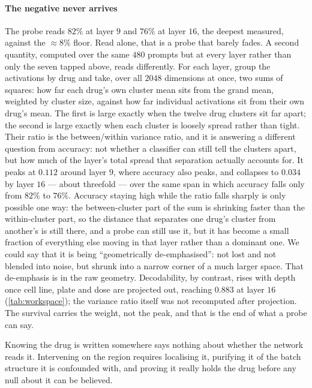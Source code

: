 \paragraph{The negative never arrives} The probe reads $82\%$ at layer $9$ and
$76\%$ at layer $16$, the deepest measured, against the $\approx 8\%$ floor.
Read alone, that is a probe that barely fades. A second quantity, computed over
the same $480$ prompts but at every layer rather than only the seven tapped
above, reads differently. For each layer, group the activations by drug and
take, over all $2048$ dimensions at once, two sums of squares: how far each
drug's own cluster mean sits from the grand mean, weighted by cluster size,
against how far individual activations sit from their own drug's mean. The
first is large exactly when the twelve drug clusters sit far apart; the second
is large exactly when each cluster is loosely spread rather than tight. Their
ratio is the between/within variance ratio, and it is answering a different
question from accuracy: not whether a classifier can still tell the clusters
apart, but how much of the layer's total spread that separation actually
accounts for. It peaks at $0.112$ around layer $9$, where accuracy also peaks,
and collapses to $0.034$ by layer $16$ --- about threefold --- over the same
span in which accuracy falls only from $82\%$ to $76\%$. Accuracy staying high
while the ratio falls sharply is only possible one way: the between-cluster
part of the sum is shrinking faster than the within-cluster part, so the
distance that separates one drug's cluster from another's is still there, and
a probe can still use it, but it has become a small fraction of everything
else moving in that layer rather than a dominant one. We could say that it is being
``geometrically de-emphasised'': not lost and not blended into
noise, but shrunk into a narrow corner of a much larger space. That de-emphasis is in the raw geometry. Decodability, by contrast, rises with depth once cell line, plate and dose are projected out, reaching $0.883$ at layer $16$ (\cref{tab:workspace}); the variance ratio itself was not recomputed after projection. The
survival carries the weight, not the peak, and that is the end of what a probe
can say.




\begin{question}[3]
Knowing the drug is written somewhere says nothing about whether the network
reads it. Intervening on the region requires localising it, purifying it of the
batch structure it is confounded with, and proving it really holds the drug
before any null about it can be believed.
\end{question}

